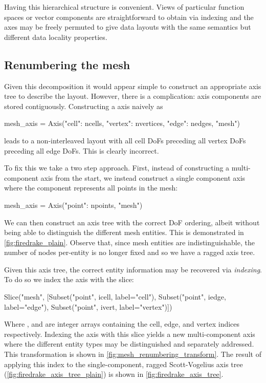 \documentclass[thesis]{subfiles}
\begin{document}
Having this hierarchical structure is convenient.
Views of particular function spaces or vector components are straightforward to obtain via indexing and the axes may be freely permuted to give data layouts with the same semantics but different data locality properties.

\subsection{Renumbering the mesh}
\label{sec:firedrake_renumbering_mesh}

Given this decomposition it would appear simple to construct an appropriate axis tree to describe the layout.
However, there is a complication: axis components are stored contiguously.
Constructing a  axis naively as
\begin{pyinline}
  mesh_axis = Axis({"cell": ncells, "vertex": nvertices, "edge": nedges},
                   "mesh")
\end{pyinline}
leads to a non-interleaved layout with all cell DoFs preceding all vertex DoFs preceding all edge DoFs.
This is clearly incorrect.

To fix this we take a two step approach.
First, instead of constructing a multi-component  axis from the start, we instead construct a single component axis where the component represents all points in the mesh:
\begin{pyinline}
  mesh_axis = Axis({"point": npoints}, "mesh")
\end{pyinline}
We can then construct an axis tree with the correct DoF ordering, albeit without being able to distinguish the different mesh entities.
This is demonstrated in \cref{fig:firedrake_plain}.
Observe that, since mesh entities are indistinguishable, the number of nodes per-entity is no longer fixed and so we have a ragged axis tree.

Given this axis tree, the correct entity information may be recovered via \emph{indexing}.
To do so we index the  axis with the slice:
\begin{pyinline}
  Slice("mesh", [Subset("point", icell, label="cell"),
                 Subset("point", iedge, label="edge"),
                 Subset("point", ivert, label="vertex")])
\end{pyinline}
Where ,  and  are integer arrays containing the cell, edge, and vertex indices respectively.
Indexing the  axis with this slice yields a new multi-component axis where the different entity types may be distinguished and separately addressed.
This transformation is shown in \cref{fig:mesh_renumbering_transform}.
The result of applying this index to the single-component, ragged Scott-Vogelius axis tree (\cref{fig:firedrake_axis_tree_plain}) is shown in \cref{fig:firedrake_axis_tree}.
\end{document}
